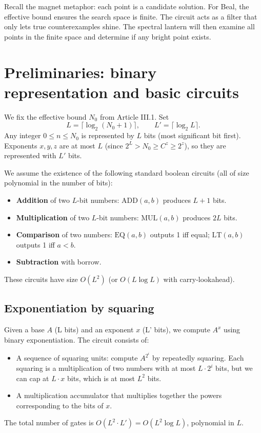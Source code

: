 \documentclass[11pt,a4paper]{article}
\begin{document}
Recall the magnet metaphor: each point is a candidate solution. For Beal, the effective bound ensures the search space is finite. The circuit acts as a filter that only lets true counterexamples shine. The spectral lantern will then examine all points in the finite space and determine if any bright point exists.

\section{Preliminaries: binary representation and basic circuits}

We fix the effective bound \(N_0\) from Article III.1. Set
\[
L = \lceil \log_2 (N_0+1) \rceil,\qquad L' = \lceil \log_2 L\rceil.
\]
Any integer \(0 \le n \le N_0\) is represented by \(L\) bits (most significant bit first). Exponents \(x,y,z\) are at most \(L\) (since \(2^L > N_0 \ge C^z \ge 2^z\)), so they are represented with \(L'\) bits.

We assume the existence of the following standard boolean circuits (all of size polynomial in the number of bits):
\begin{itemize}
\item \textbf{Addition} of two \(L\)-bit numbers: \(\mathrm{ADD}(a,b)\) produces \(L+1\) bits.
\item \textbf{Multiplication} of two \(L\)-bit numbers: \(\mathrm{MUL}(a,b)\) produces \(2L\) bits.
\item \textbf{Comparison} of two numbers: \(\mathrm{EQ}(a,b)\) outputs 1 iff equal; \(\mathrm{LT}(a,b)\) outputs 1 iff \(a<b\).
\item \textbf{Subtraction} with borrow.
\end{itemize}
These circuits have size \(O(L^2)\) (or \(O(L \log L)\) with carry‑lookahead).

\subsection{Exponentiation by squaring}

Given a base \(A\) (L bits) and an exponent \(x\) (L' bits), we compute \(A^x\) using binary exponentiation. The circuit consists of:
\begin{itemize}
\item A sequence of squaring units: compute \(A^{2^i}\) by repeatedly squaring. Each squaring is a multiplication of two numbers with at most \(L \cdot 2^i\) bits, but we can cap at \(L \cdot x\) bits, which is at most \(L^2\) bits.
\item A multiplication accumulator that multiplies together the powers corresponding to the bits of \(x\).
\end{itemize}
The total number of gates is \(O(L^2 \cdot L') = O(L^2 \log L)\), polynomial in \(L\).
\end{document}
